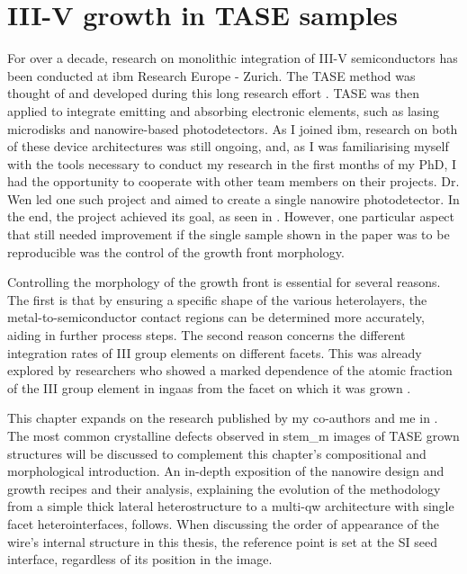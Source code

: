 \chapter{III-V growth in TASE samples}
\label{chap:growth}

For over a decade, research on monolithic integration of III-V semiconductors has been conducted at \acs{ibm} Research Europe - Zurich. The \acf{TASE} method was thought of and developed during this long research effort \cite{borgTASEp2018, Mauthe2021}. \acs{TASE} was then applied to integrate emitting and absorbing electronic elements, such as lasing microdisks and nanowire-based photodetectors. As I joined \acs{ibm}, research on both of these device architectures was still ongoing, and, as I was familiarising myself with the tools necessary to conduct my research in the first months of my PhD, I had the opportunity to cooperate with other team members on their projects. Dr. Wen led one such project and aimed to create a single nanowire photodetector. In the end, the project achieved its goal, as seen in \cite{Wen2022}. However, one particular aspect that still needed improvement if the single sample shown in the paper was to be reproducible was the control of the growth front morphology.

Controlling the morphology of the growth front is essential for several reasons. The first is that by ensuring a specific shape of the various heterolayers, the metal-to-semiconductor contact regions can be determined more accurately, aiding in further process steps. The second reason concerns the different integration rates of III group elements on different facets. This was already explored by researchers who showed a marked dependence of the atomic fraction of the III group element in \acs{ingaas} from the facet on which it was grown \cite{Borg2019}.

This chapter expands on the research published by my co-authors and me in \cite{Brugnolotto2023}. The most common crystalline defects observed in \acs{stem_m} images of \acs{TASE} grown structures will be discussed to complement this chapter's compositional and morphological introduction. An in-depth exposition of the nanowire design and growth recipes and their analysis, explaining the evolution of the methodology from a simple thick lateral heterostructure to a multi-\acl{qw} architecture with single facet heterointerfaces, follows. When discussing the order of appearance of the wire's internal structure in this thesis, the reference point is set at the \acf{SI} seed interface, regardless of its position in the image.

